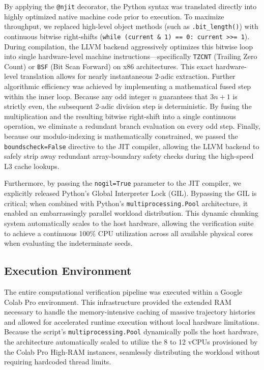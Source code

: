 \documentclass[11pt, a4paper]{article}
\theoremstyle{definition}
\begin{document}
By applying the \texttt{@njit} decorator, the Python syntax was translated directly into highly optimized native machine code prior to execution. To maximize throughput, we replaced high-level object methods (such as \texttt{.bit\_length()}) with continuous bitwise right-shifts (\texttt{while (current \& 1) == 0: current >>= 1}). During compilation, the LLVM backend aggressively optimizes this bitwise loop into single hardware-level machine instructions---specifically \texttt{TZCNT} (Trailing Zero Count) or \texttt{BSF} (Bit Scan Forward) on x86 architectures. This exact hardware-level translation allows for nearly instantaneous 2-adic extraction. Further algorithmic efficiency was achieved by implementing a mathematical fused step within the inner loop. Because any odd integer $n$ guarantees that $3n+1$ is strictly even, the subsequent 2-adic division step is deterministic. By fusing the multiplication and the resulting bitwise right-shift into a single continuous operation, we eliminate a redundant branch evaluation on every odd step. Finally, because our modulo-indexing is mathematically constrained, we passed the \texttt{boundscheck=False} directive to the JIT compiler, allowing the LLVM backend to safely strip away redundant array-boundary safety checks during the high-speed L3 cache lookups.

Furthermore, by passing the \texttt{nogil=True} parameter to the JIT compiler, we explicitly released Python's Global Interpreter Lock (GIL). Bypassing the GIL is critical; when combined with Python's \texttt{multiprocessing.Pool} architecture, it enabled an embarrassingly parallel workload distribution. This dynamic chunking system automatically scales to the host hardware, allowing the verification suite to achieve a continuous 100\% CPU utilization across all available physical cores when evaluating the indeterminate seeds.

\subsection{Execution Environment}
The entire computational verification pipeline was executed within a Google Colab Pro environment. This infrastructure provided the extended RAM necessary to handle the memory-intensive caching of massive trajectory histories and allowed for accelerated runtime execution without local hardware limitations. Because the script's \texttt{multiprocessing.Pool} dynamically polls the host hardware, the architecture automatically scaled to utilize the 8 to 12 vCPUs provisioned by the Colab Pro High-RAM instances, seamlessly distributing the workload without requiring hardcoded thread limits.
\end{document}
